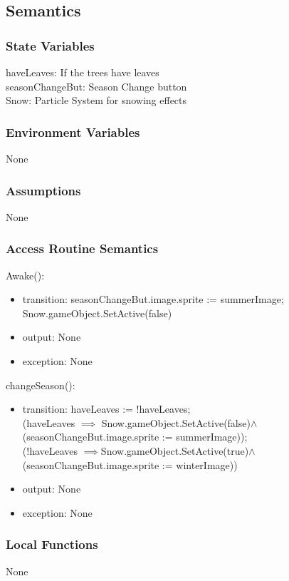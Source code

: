 \documentclass[12pt, titlepage]{article}
\begin{document}
\subsection{Semantics}

\subsubsection{State Variables}
haveLeaves: If the trees have leaves\\
seasonChangeBut: Season Change button\\
Snow: Particle System for snowing effects

\subsubsection{Environment Variables}
None
\subsubsection{Assumptions}
None
\subsubsection{Access Routine Semantics}

\noindent Awake():
\begin{itemize}
\item transition: seasonChangeBut.image.sprite := summerImage;\\
        Snow.gameObject.SetActive(false)
\item output: None
\item exception: None
\end{itemize}

\noindent changeSeason():
\begin{itemize}
\item transition: haveLeaves := !haveLeaves;\\
(haveLeaves $\implies$ Snow.gameObject.SetActive(false)$\land$
             (seasonChangeBut.image.sprite := summerImage));\\
(!haveLeaves $\implies$Snow.gameObject.SetActive(true)$\land$(seasonChangeBut.image.sprite := winterImage))\\
\item output: None
\item exception: None
\end{itemize}




\subsubsection{Local Functions}
None
\end{document}
